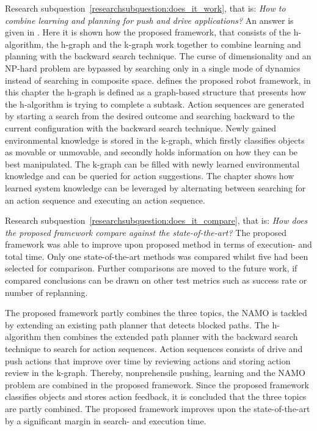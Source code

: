 Research subquestion~\ref{researchsubquestion:does_it_work}, that is: \textit{How to combine learning and planning for push and drive applications?} An answer is given in . Here it is shown how the proposed framework, that consists of the \acf{h-algorithm}, the \acf{h-graph} and the \acf{k-graph} work together to combine learning and planning with the backward search technique. The curse of dimensionality and an \ac{NP-hard} problem are bypassed by searching only in a single mode of dynamics instead of searching in composite space.  defines the proposed robot framework, in this chapter the \ac{h-graph} is defined as a graph-based structure that presents how the \ac{h-algorithm} is trying to complete a subtask. Action sequences are generated by starting a search from the desired outcome and searching backward to the current configuration with the backward search technique. Newly gained environmental knowledge is stored in the \ac{k-graph}, which firstly classifies objects as movable or unmovable, and secondly holds information on how they can be best manipulated. The \ac{k-graph} can be filled with newly learned environmental knowledge and can be queried for action suggestions. The chapter shows how learned system knowledge can be leveraged by alternating between searching for an action sequence and executing an action sequence.\bs

Research subquestion~\ref{researchsubquestion:does_it_compare}, that is: \textit{How does the proposed framework compare against the state-of-the-art?} The proposed framework was able to improve upon \citeauthor{wang_affordancebased_2020} proposed method in terms of execution- and total time. Only one state-of-the-art methods was compared whilst five had been selected for comparison. Further comparisons are moved to the future work, if compared conclusions can be drawn on other test metrics such as success rate or number of replanning.\bs

The proposed framework partly combines the three topics, the \ac{NAMO} is tackled by extending an existing path planner that detects blocked paths. The \ac{h-algorithm} then combines the extended path planner with the backward search technique to search for action sequences. Action sequences consists of drive and push actions that improve over time by reviewing actions and storing action review in the \ac{k-graph}. Thereby, nonprehensile pushing, learning and the \ac{NAMO} problem are combined in the proposed framework. Since the proposed framework classifies objects and stores action feedback, it is concluded that the three topics are partly combined. The proposed framework improves upon the state-of-the-art by a significant margin in search- and execution time.\bs
